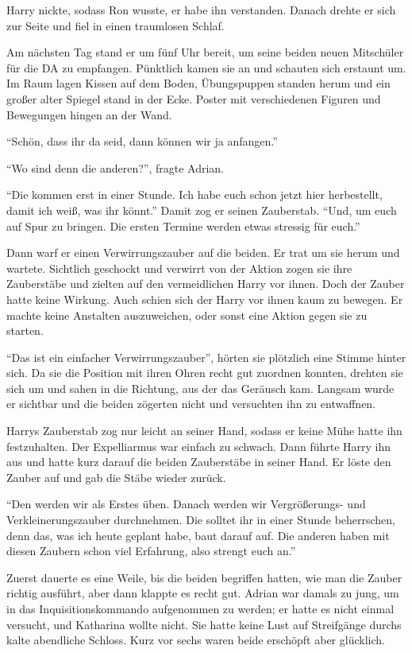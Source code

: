 Harry nickte, sodass Ron wusste, er habe ihn verstanden. Danach drehte er sich zur Seite und fiel in einen traumlosen Schlaf.

Am nächsten Tag stand er um fünf Uhr bereit, um seine beiden neuen Mitschüler für die DA zu empfangen. Pünktlich kamen sie an und schauten sich erstaunt um. Im Raum lagen Kissen auf dem Boden, Übungspuppen standen herum und ein großer alter Spiegel stand in der Ecke. Poster mit verschiedenen Figuren und Bewegungen hingen an der Wand.

\enquote{Schön, dass ihr da seid, dann können wir ja anfangen.}

\enquote{Wo sind denn die anderen?}, fragte Adrian.

\enquote{Die kommen erst in einer Stunde. Ich habe euch schon jetzt hier herbestellt, damit ich weiß, was ihr könnt.} Damit zog er seinen Zauberstab. \enquote{Und, um euch auf Spur zu bringen. Die ersten Termine werden etwas stressig für euch.}

Dann warf er einen Verwirrungszauber auf die beiden. Er trat um sie herum und wartete. Sichtlich geschockt und verwirrt von der Aktion zogen sie ihre Zauberstäbe und zielten auf den vermeidlichen Harry vor ihnen. Doch der Zauber hatte keine Wirkung. Auch schien sich der Harry vor ihnen kaum zu bewegen. Er machte keine Anstalten auszuweichen, oder sonst eine Aktion gegen sie zu starten.

\enquote{Das ist ein einfacher Verwirrungszauber}, hörten sie plötzlich eine Stimme hinter sich. Da sie die Position mit ihren Ohren recht gut zuordnen konnten, drehten sie sich um und sahen in die Richtung, aus der das Geräusch kam. Langsam wurde er sichtbar und die beiden zögerten nicht und versuchten ihn zu entwaffnen.

Harrys Zauberstab zog nur leicht an seiner Hand, sodass er keine Mühe hatte ihn festzuhalten. Der Expelliarmus war einfach zu schwach. Dann führte Harry ihn aus und hatte kurz darauf die beiden Zauberstäbe in seiner Hand. Er löste den Zauber auf und gab die Stäbe wieder zurück.

\enquote{Den werden wir als Erstes üben. Danach werden wir Vergrößerungs- und Verkleinerungszauber durchnehmen. Die solltet ihr in einer Stunde beherrschen, denn das, was ich heute geplant habe, baut darauf auf. Die anderen haben mit diesen Zaubern schon viel Erfahrung, also strengt euch an.}

Zuerst dauerte es eine Weile, bis die beiden begriffen hatten, wie man die Zauber richtig ausführt, aber dann klappte es recht gut. Adrian war damals zu jung, um in das Inquisitionskommando aufgenommen zu werden; er hatte es nicht einmal versucht, und Katharina wollte nicht. Sie hatte keine Lust auf Streifgänge durchs kalte abendliche Schloss. Kurz vor sechs waren beide erschöpft aber glücklich.

